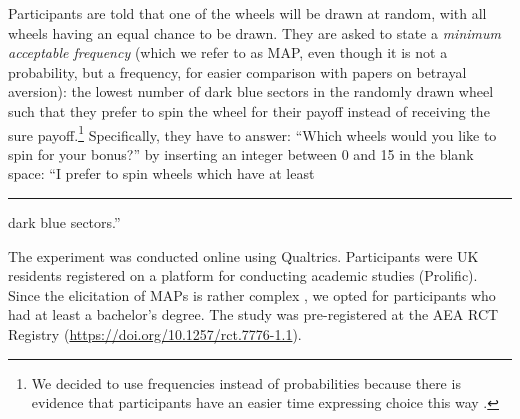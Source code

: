 Participants are told that one of the wheels will be drawn at random, with all wheels having an equal chance to be drawn.
They are asked to state a \textit{minimum acceptable frequency} (which we refer to as MAP, even though it is not a probability, but a frequency, for easier comparison with papers on betrayal aversion): the lowest number of dark blue sectors in the randomly drawn wheel such that they prefer to spin the wheel for their payoff instead of receiving the sure payoff.\footnote{
We decided to use frequencies instead of probabilities because there is evidence that participants have an easier time expressing choice this way \citep{Quercia2016}.}
Specifically, they have to answer: ``Which wheels would you like to spin for your bonus?'' by inserting an integer between 0 and 15 in the blank space: ``I prefer to spin wheels which have at least \rule{1cm}{0.15mm} dark blue sectors.''

The experiment was conducted online using Qualtrics.
Participants were UK residents registered on a platform for conducting academic studies (Prolific).
Since the elicitation of MAPs is rather complex \citep{Quercia2016,Polipciuc2022inout}, we opted for participants who had at least a bachelor's degree.
The study was pre-registered at the AEA RCT Registry (\url{https://doi.org/10.1257/rct.7776-1.1}).

